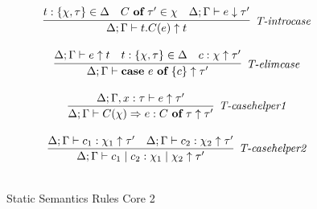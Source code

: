 \begin{figure}
\[\begin{array}{c}
\infer[\textit{T-introcase}]
	{\Delta; \Gamma \vdash  t.C(e) \uparrow t} 
	{t:\{\chi, \tau\} \in \Delta & C\ \keyw{of}\ \tau' \in \chi &\Delta; \Gamma \vdash e \downarrow \tau'}\\[3ex]

\infer[\textit{T-elimcase}]
	{\Delta; \Gamma \vdash  \keyw{case}~e~\keyw{of}~\{ c \} \uparrow\tau'} 
	{\Delta; \Gamma \vdash e \uparrow t & t:\{ \chi,\tau\} \in \Delta & c:\chi \uparrow \tau'}\\[3ex]

\infer[\textit{T-casehelper1}]
	{\Delta; \Gamma \vdash  C(\chi)\Rightarrow e : C\ \keyw{of}\ \tau \uparrow \tau'} 
	{\Delta; \Gamma, x:\tau \vdash e \uparrow \tau'}\\[3ex]

\infer[\textit{T-casehelper2}]
	{\Delta; \Gamma \vdash  c_1 \bnfalt c_2: \chi_1 \bnfalt \chi_2 \uparrow \tau' } 
	{\Delta; \Gamma \vdash c_1:\chi_1 \uparrow \tau' & \Delta; \Gamma \vdash c_2:\chi_2 \uparrow \tau'}\\[3ex]


\end{array}
\]
\caption{Static Semantics Rules Core 2}
\end{figure}

